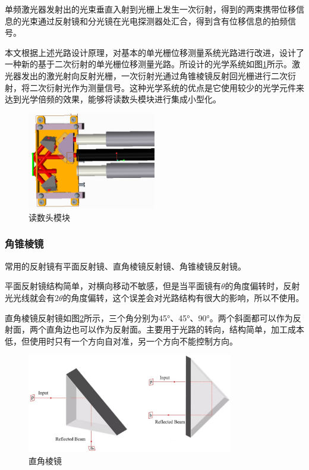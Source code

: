 \documentclass[type=master,oneside]{fduthesis}
\begin{document}
单频激光器发射出的光束垂直入射到光栅上发生一次衍射，得到的两束携带位移信息的光束通过反射镜和分光镜在光电探测器处汇合，得到含有位移信息的拍频信号。

本文根据上述光路设计原理，对基本的单光栅位移测量系统光路进行改进，设计了一种新的基于二次衍射的单光栅位移测量光路。所设计的光学系统如图\ref{fig:读数头模块}所示。激光器发出的激光射向反射光栅，一次衍射光通过角锥棱镜反射回光栅进行二次衍射，将二次衍射光作为测量信号。这种光学系统的优点是它使用较少的光学元件来达到光学倍频的效果，能够将读数头模块进行集成小型化。

\begin{figure}[htb]
  \centering
  \includegraphics[width=0.5\textwidth]{3-fig//读数头模块.png}
  \caption{读数头模块}
  \label{fig:读数头模块}
\end{figure}

\subsubsection{角锥棱镜}
常用的反射镜有平面反射镜、直角棱镜反射镜、角锥棱镜反射镜。

平面反射镜结构简单，对横向移动不敏感，但是当平面镜有$\theta $的角度偏转时，反射光光线就会有$2\theta $的角度偏转，这个误差会对光路结构有很大的影响，所以不使用。

直角棱镜反射镜如图\ref{fig:直角棱镜}所示，三个角分别为45°、45°、90°。两个斜面都可以作为反射面，两个直角边也可以作为反射面。主要用于光路的转向，结构简单，加工成本低，但使用时只有一个方向自对准，另一个方向不能控制方向。
\begin{figure}[H]
  \centering
  \includegraphics[width=0.8\textwidth]{3-fig//直角棱镜.jpg}
  \caption{直角棱镜}
  \label{fig:直角棱镜}
\end{figure}
\end{document}
